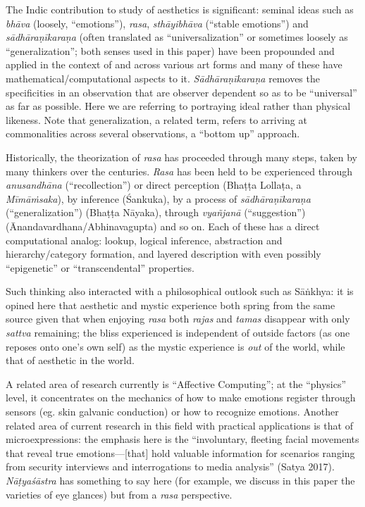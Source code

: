 The Indic contribution to study of aesthetics is significant: seminal ideas such as \textsl{bhāva} (loosely, “emotions”), \textsl{rasa}, \textsl{sthāyibhāva} (“stable emotions”) and \textsl{sādhāraṇīkaraṇa} (often translated as “universalization” or sometimes loosely as “generalization”; both senses used in this paper) have been propounded and applied in the context of and across various art forms and many of these have mathematical/computational aspects to it. \textsl{Sādhāraṇīkaraṇa} removes the specificities in an observation that are observer dependent so as to be “universal” as far as possible. Here we are referring to portraying ideal rather than physical likeness. Note that generalization, a related term, refers to arriving at commonalities across several observations, a “bottom up” approach.

Historically, the theorization of \textsl{rasa} has proceeded through many steps, taken by many thinkers over the centuries. \textsl{Rasa} has been held to be experienced through \textsl{anusandhāna} (“recollection”) or direct perception (Bhaṭṭa Lollaṭa, a \textsl{Mīmāṁsaka}), by inference (Śankuka), by a process of \textsl{sādhāraṇīkaraṇa} (“generalization”) (Bhaṭṭa Nāyaka), through \textsl{vyañjanā} (“suggestion”) (Ānandavardhana/Abhinavagupta) and so on. Each of these has a direct computational analog: lookup, logical inference, abstraction and hierarchy/category formation, and layered description with even possibly “epigenetic” or “transcendental” properties.

Such thinking also interacted with a philosophical outlook such as Sāṅkhya: it is opined here that aesthetic and mystic experience both spring from the same source given that when enjoying \textsl{rasa} both \textsl{rajas} and \textsl{tamas} disappear with only \textsl{sattva} remaining; the bliss experienced is independent of outside factors (as one reposes onto one’s own self) as the mystic experience is \textsl{out} of the world, while that of aesthetic in the world.

A related area of research currently is “Affective Computing”; at the “physics” level, it concentrates on the mechanics of how to make emotions register through sensors (eg. skin galvanic conduction) or how to recognize emotions. Another related area of current research in this field with practical applications is that of microexpressions: the emphasis here is the “involuntary, fleeting facial movements that reveal true emotions—[that] hold valuable information for scenarios ranging from security interviews and interrogations to media analysis” (Satya 2017). \textsl{Nāṭyaśāstra} has something to say here (for example, we discuss in this paper the varieties of eye glances) but from a \textsl{rasa} perspective.

